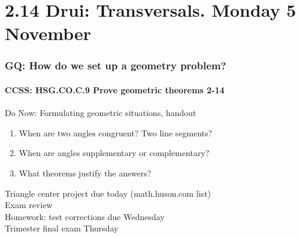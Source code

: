 \documentclass{beamer}
\begin{document}
\section{2.14 Drui: Transversals. Monday 5 November}
  \frame
  {
    \frametitle{GQ: How do we set up a geometry problem?}
    \framesubtitle{CCSS: HSG.CO.C.9 Prove geometric theorems  \alert{2-14}}

    \begin{block}{Do Now: Formulating geometric situations, handout}
      \begin{enumerate}
          \item When are two angles congruent? Two line segments?
          \item When are angles supplementary or complementary?
          \item What theorems justify the answers?
      \end{enumerate}
    \end{block}
    Triangle center project due today (math.huson.com list)\\
    Exam review\\
    \vspace{0.2cm}
    Homework: test corrections due Wednesday\\
    Trimester final exam Thursday
  }
\end{document}
